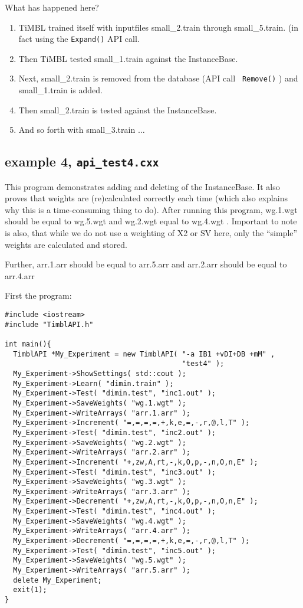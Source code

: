 \documentclass{report}
\begin{document}
What has happened here?

\begin{enumerate}
\item TiMBL trained itself with inputfiles small\_2.train through
small\_5.train. (in fact using the {\tt Expand()} API call.
\item Then TiMBL tested small\_1.train against the InstanceBase.
\item Next, small\_2.train is removed from the database (API call {\tt
Remove()} ) and small\_1.train is added.
\item Then small\_2.train is tested against the InstanceBase.
\item And so forth with small\_3.train $\ldots$
\end{enumerate}
\clearpage

\subsection{example 4, {\tt api\_test4.cxx}}

This program demonstrates adding and deleting of the InstanceBase.  It
also proves that weights are (re)calculated correctly each time (which
also explains why this is a time-consuming thing to do). After running
this program, wg.1.wgt should be equal to wg.5.wgt and wg.2.wgt equal to
wg.4.wgt . Important to note is also, that while we do not use a weighting
of X2 or SV here, only the ``simple'' weights are calculated and
stored.

Further, arr.1.arr should be equal to arr.5.arr and arr.2.arr should be equal
to arr.4.arr

First the program: 

\begin{footnotesize}
\begin{verbatim}
#include <iostream>
#include "TimblAPI.h"

int main(){
  TimblAPI *My_Experiment = new TimblAPI( "-a IB1 +vDI+DB +mM" , 
                                          "test4" );
  My_Experiment->ShowSettings( std::cout );
  My_Experiment->Learn( "dimin.train" );  
  My_Experiment->Test( "dimin.test", "inc1.out" );
  My_Experiment->SaveWeights( "wg.1.wgt" );  
  My_Experiment->WriteArrays( "arr.1.arr" );  
  My_Experiment->Increment( "=,=,=,=,+,k,e,=,-,r,@,l,T" );  
  My_Experiment->Test( "dimin.test", "inc2.out" );
  My_Experiment->SaveWeights( "wg.2.wgt" );  
  My_Experiment->WriteArrays( "arr.2.arr" );  
  My_Experiment->Increment( "+,zw,A,rt,-,k,O,p,-,n,O,n,E" );  
  My_Experiment->Test( "dimin.test", "inc3.out" );
  My_Experiment->SaveWeights( "wg.3.wgt" );  
  My_Experiment->WriteArrays( "arr.3.arr" );  
  My_Experiment->Decrement( "+,zw,A,rt,-,k,O,p,-,n,O,n,E" );  
  My_Experiment->Test( "dimin.test", "inc4.out" );
  My_Experiment->SaveWeights( "wg.4.wgt" );  
  My_Experiment->WriteArrays( "arr.4.arr" );  
  My_Experiment->Decrement( "=,=,=,=,+,k,e,=,-,r,@,l,T" );  
  My_Experiment->Test( "dimin.test", "inc5.out" );
  My_Experiment->SaveWeights( "wg.5.wgt" );  
  My_Experiment->WriteArrays( "arr.5.arr" );  
  delete My_Experiment;
  exit(1);
}
\end{verbatim}
\end{footnotesize}
\end{document}
